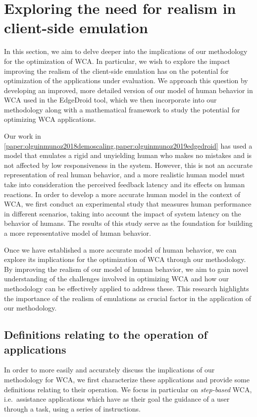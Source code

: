 \section{Exploring the need for realism in client-side emulation}\label{summary:realism}

In this section, we aim to delve deeper into the implications of our methodology for the optimization of \gls{WCA}.
In particular, we wish to explore the impact improving the realism of the client-side emulation has on the potential for optimization of the applications under evaluation.
We approach this question by developing an improved, more detailed version of our model of human behavior in \gls{WCA} used in the EdgeDroid tool, which we then incorporate into our methodology along with a mathematical framework to study the potential for optimizing \gls{WCA} applications. 

Our work in \cref{paper:olguinmunoz2018demoscaling,paper:olguinmunoz2019edgedroid} has used a model that emulates a rigid and unyielding human who makes no mistakes and is not affected by low responsiveness in the system.
However, this is not an accurate representation of real human behavior, and a more realistic human model must take into consideration the perceived feedback latency and its effects on human reactions.
In order to develop a more accurate human model in the context of \gls{WCA}, we first conduct an experimental study that measures human performance in different scenarios, taking into account the impact of system latency on the behavior of humans.
The results of this study serve as the foundation for building a more representative model of human behavior.

Once we have established a more accurate model of human behavior, we can explore its implications for the optimization of \gls{WCA} through our methodology.
By improving the realism of our model of human behavior, we aim to gain novel understanding of the challenges involved in optimizing \gls{WCA} and how our methodology can be effectively applied to address these.
This research highlights the importance of the realism of emulations as  crucial factor in the application of our methodology.

\subsection{Definitions relating to the operation of  applications}

In order to more easily and accurately discuss the implications of our methodology for \gls{WCA}, we first characterize these applications and provide some definitions relating to their operation.
We focus in particular on \emph{step-based} \gls{WCA}, i.e.\ assistance applications which have as their goal the guidance of a user through a task, using a series of instructions.

